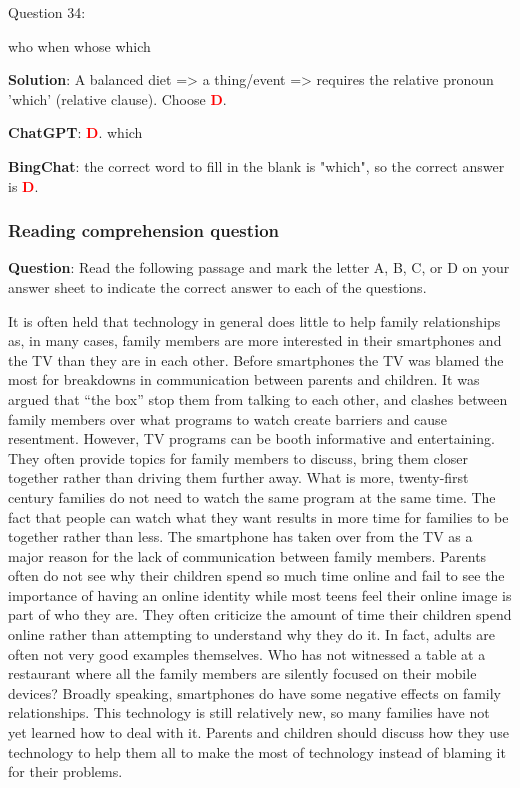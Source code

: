 \documentclass{article}
\begin{document}
{\begin{mdframed}[linewidth=1pt,linecolor=red]
		Question 34: 
		
		\begin{oneparchoices}
			\choice who
			\choice when
			\choice whose		
			\choice  which
		\end{oneparchoices}
		
		\textbf{Solution}: A balanced diet => a thing/event => requires the relative pronoun 'which' (relative clause). Choose \textcolor{red}{\textbf{D}}. 
		
		\textbf{ChatGPT}: \textcolor{red}{\textbf{D}}. which
		
		\textbf{BingChat}: the correct word to fill in the blank is "which", so the correct answer is \textcolor{red}{\textbf{D}}.
		
	\end{mdframed}
	
	\subsubsection{Reading comprehension question}
	\label{VNHSGE_Eng_RC}
	\begin{mdframed}[linewidth=1pt,linecolor=red] \textbf{Question}: 
		Read the following passage and mark the letter A, B, C, or D on your answer sheet to indicate the correct answer to each of the questions.
		
		It is often held that technology in general does little to help family relationships as, in many cases, family members are more interested in their smartphones and the TV than they are in each other. Before smartphones the TV was blamed the most for breakdowns in communication between parents and children. It was argued that “the box” stop them from talking to each other, and clashes between family members over what programs to watch create barriers and cause resentment.
		However, TV programs can be booth informative and entertaining. They often provide topics for family members to discuss, bring them closer together rather than driving them further away. What is more, twenty-first century families do not need to watch the same program at the same time. The fact that people can watch what they want results in more time for families to be together rather than less.
		The smartphone has taken over from the TV as a major reason for the lack of communication between family members. Parents often do not see why their children spend so much time online and fail to see the importance of having an online identity while most teens feel their online image is part of who they are. They often criticize the amount of time their children spend online rather than attempting to understand why they do it. In fact, adults are often not very good examples themselves. Who has not witnessed a table at a restaurant where all the family members are silently focused on their mobile devices?
		Broadly speaking, smartphones do have some negative effects on family relationships. This technology is still relatively new, so many families have not yet learned how to deal with it. Parents and children should discuss how they use technology to help them all to make the most of technology instead of blaming it for their problems.
		

\end{mdframed}}
\end{document}
